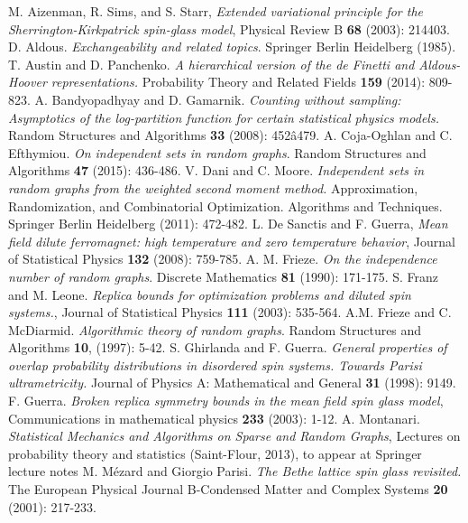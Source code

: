 \documentclass[a4paper,12pt,oneside,reqno]{amsart}
\numberwithin{equation}{section}
\begin{document}
\begin{thebibliography}{1} 
 M. Aizenman, R. Sims, and S. Starr, {\it Extended variational principle for the Sherrington-Kirkpatrick spin-glass model}, Physical Review B {\bf 68} (2003): 214403. 
 D. Aldous. {\it Exchangeability and related topics}. Springer Berlin Heidelberg (1985).
 T. Austin and D. Panchenko. {\it A hierarchical version of the de Finetti and Aldous-Hoover representations.} Probability Theory and Related Fields {\bf 159} (2014): 809-823.
 A. Bandyopadhyay and D. Gamarnik. {\it Counting without sampling: Asymptotics of the log-partition function for certain statistical physics models.} Random Structures and Algorithms {\bf 33} (2008): 452â479. 
 A. Coja-Oghlan and C. Efthymiou. {\it On independent sets in random graphs}. Random Structures and Algorithms {\bf 47} (2015): 436-486.
 V. Dani and C. Moore. {\it Independent sets in random graphs from the weighted second moment method.} Approximation, Randomization, and Combinatorial Optimization. Algorithms and Techniques. Springer Berlin Heidelberg (2011): 472-482.
 L. De Sanctis and F. Guerra, {\it Mean field dilute ferromagnet: high temperature 
and zero temperature behavior}, Journal of Statistical Physics {\bf 132} (2008): 759-785. 
 A. M.  Frieze. {\it On the independence number of random graphs}. Discrete Mathematics {\bf 81} (1990): 171-175.
 S. Franz and M. Leone. {\it Replica bounds for optimization problems and diluted spin systems.}, Journal of Statistical Physics {\bf 111} (2003): 535-564.
 A.M. Frieze and C. McDiarmid. {\it Algorithmic theory of random graphs}. Random Structures and Algorithms  {\bf 10}, (1997): 5-42.
 S. Ghirlanda and F. Guerra. {\it General properties of overlap probability distributions in disordered spin systems. Towards Parisi ultrametricity.} Journal of Physics A: Mathematical and General {\bf 31} 
(1998): 9149.
 F. Guerra. {\it Broken replica symmetry bounds in the mean field spin glass model},  Communications in mathematical physics {\bf 233} (2003): 1-12.
 A. Montanari. {\it Statistical Mechanics and Algorithms on Sparse and Random Graphs}, 
Lectures on probability theory and statistics (Saint-Flour, 2013), to appear at Springer lecture notes
 M. M\'{e}zard and Giorgio Parisi. {\it The Bethe lattice spin glass revisited.} 
The European Physical Journal B-Condensed Matter and Complex Systems {\bf 20} (2001): 217-233.

\end{thebibliography}
\end{document}
